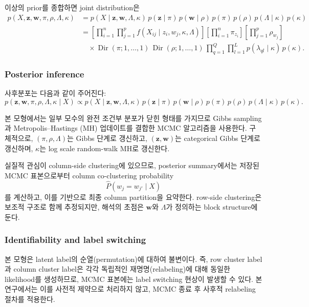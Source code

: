 \documentclass[A4paper,11pt]{article}
\begin{document}
이상의 prior를 종합하면 joint distribution은
\begin{align*}
p(X,\mathbf{z},\mathbf{w},\pi,\rho,\Lambda,\kappa)
&=
p(X\mid \mathbf{z},\mathbf{w},\Lambda,\kappa)\,
p(\mathbf{z}\mid\pi)\,
p(\mathbf{w}\mid\rho)\,
p(\pi)\,
p(\rho)\,
p(\Lambda\mid \kappa)\,
p(\kappa) \\
&=
\left[
\prod_{i=1}^{n}\prod_{j=1}^{p}
f(X_{ij}\mid z_i,w_j,\kappa,\Lambda)
\right]
\left[
\prod_{i=1}^{n}\pi_{z_i}
\right]
\left[
\prod_{j=1}^{p}\rho_{w_j}
\right] \\
&\quad\times
\operatorname{Dir}(\pi;1,\ldots,1)\,
\operatorname{Dir}(\rho;1,\ldots,1)\,
\prod_{q=1}^{Q}\prod_{l=1}^{L}
p(\lambda_{ql}\mid \kappa)\,
p(\kappa).
\end{align*}

\subsubsection{Posterior inference}

사후분포는 다음과 같이 주어진다:
\[
p(\mathbf{z},\mathbf{w},\pi,\rho,\Lambda,\kappa \mid X)
\propto
p(X\mid \mathbf{z},\mathbf{w},\Lambda,\kappa)\,
p(\mathbf{z}\mid\pi)\,
p(\mathbf{w}\mid\rho)\,
p(\pi)\,
p(\rho)\,
p(\Lambda\mid \kappa)\,
p(\kappa).
\]

본 모형에서는 일부 모수의 완전 조건부 분포가 닫힌 형태를 가지므로 Gibbs sampling과 Metropolis--Hastings (MH) 업데이트를 결합한 MCMC 알고리즘을 사용한다. 구체적으로, $(\pi,\rho,\Lambda)$는 Gibbs 단계로 갱신하고, $(\mathbf{z},\mathbf{w})$는 categorical Gibbs 단계로 갱신하며, $\kappa$는 log scale random-walk MH로 갱신한다.

실질적 관심이 column-side clustering에 있으므로, posterior summary에서는 저장된 MCMC 표본으로부터 column co-clustering probability
\[
\widehat{P}(w_j = w_{j'} \mid X)
\]
를 계산하고, 이를 기반으로 최종 column partition을 요약한다. row-side clustering은 보조적 구조로 함께 추정되지만, 해석의 초점은 $\mathbf{w}$와 $\Lambda$가 정의하는 block structure에 둔다.

\subsubsection{Identifiability and label switching}

본 모형은 latent label의 순열(permutation)에 대하여 불변이다. 즉, row cluster label과 column cluster label은 각각 독립적인 재명명(relabeling)에 대해 동일한 likelihood를 생성하므로, MCMC 표본에는 label switching 현상이 발생할 수 있다. 본 연구에서는 이를 사전적 제약으로 처리하지 않고, MCMC 종료 후 사후적 relabeling 절차를 적용한다.
\end{document}
